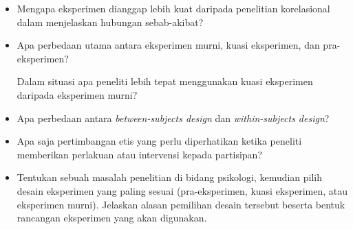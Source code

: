 \documentclass[
  indonesian,
  letterpaper,
  DIV=11,
  numbers=noendperiod]{scrreprt}
\begin{document}
\begin{tcolorbox}[enhanced jigsaw, colframe=quarto-callout-important-color-frame, toptitle=1mm, breakable, leftrule=.75mm, arc=.35mm, toprule=.15mm, colback=white, colbacktitle=quarto-callout-important-color!10!white, bottomtitle=1mm, bottomrule=.15mm, titlerule=0mm, title=\textcolor{quarto-callout-important-color}{\faExclamation}\hspace{0.5em}{Refleksi \& Diskusi}, coltitle=black, left=2mm, opacitybacktitle=0.6, opacityback=0, rightrule=.15mm]

\begin{itemize}
\item
  Mengapa eksperimen dianggap lebih kuat daripada penelitian
  korelasional dalam menjelaskan hubungan sebab-akibat?
\item
  Apa perbedaan utama antara eksperimen murni, kuasi eksperimen, dan
  pra-eksperimen?

  Dalam situasi apa peneliti lebih tepat menggunakan kuasi eksperimen
  daripada eksperimen murni?
\item
  Apa perbedaan antara \emph{between-subjects design} dan
  \emph{within-subjects design}?
\item
  Apa saja pertimbangan etis yang perlu diperhatikan ketika peneliti
  memberikan perlakuan atau intervensi kepada partisipan?
\item
  Tentukan sebuah masalah penelitian di bidang psikologi, kemudian pilih
  desain eksperimen yang paling sesuai (pra-eksperimen, kuasi
  eksperimen, atau eksperimen murni). Jelaskan alasan pemilihan desain
  tersebut beserta bentuk rancangan eksperimen yang akan digunakan.
\end{itemize}

\end{tcolorbox}
\end{document}
